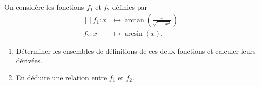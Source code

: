 
\begin{exercice}\label{exoTD4-0003}

	On considère les fonctions $f_1$ et $f_2$ définies par
	\begin{equation}
		\begin{aligned}[]
			f_1\colon x&\mapsto \arctan\left(\frac{ x }{ \sqrt{1-x^2} }\right)\\
			f_2\colon x&\mapsto \arcsin(x).
		\end{aligned}
	\end{equation}
	\begin{enumerate}
		\item
			Déterminer les ensembles de définitions de ces deux fonctions et calculer leurs dérivées.
		\item
			En déduire une relation entre $f_1$ et $f_2$.
	\end{enumerate}

\end{exercice}
